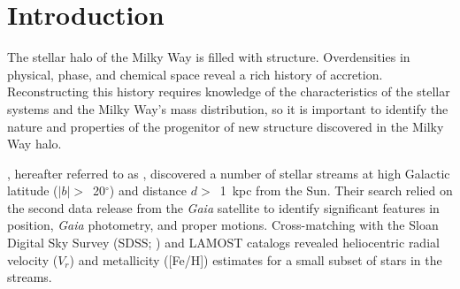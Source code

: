 \documentclass[twocolumn,tighten]{aastex62}
\newcommand{\degree}{$^{\circ}$}
\newcommand{\rv}{$V_{r}$}
\begin{document}




\section{Introduction}
\label{intro}

The stellar halo of the Milky Way is filled with structure.
Overdensities in physical, phase, and chemical space
reveal a rich history of accretion.
Reconstructing this history requires knowledge of the
characteristics of the stellar systems
and the Milky Way's mass distribution, so
it is important to identify the nature and properties of
the progenitor of new structure discovered
in the Milky Way halo.

\citet{ibata19a},
hereafter referred to as ,
discovered a number of stellar streams 
at high Galactic latitude
($|b| >$~20\degree)
and distance $d >$~1~kpc from the Sun.
Their search relied on the second data release from the 
\textit{Gaia} satellite to identify significant 
features in position, \textit{Gaia} photometry, and proper motions.
Cross-matching
with the Sloan Digital Sky Survey (SDSS; \citealt{yanny09}) and
LAMOST catalogs \citep{cui12}
revealed heliocentric radial velocity (\rv) and metallicity ([Fe/H])
estimates for a small subset of stars in the streams.
\end{document}
